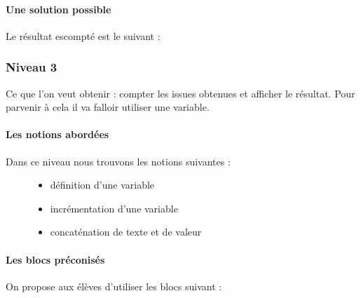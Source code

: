 \documentclass[letterpaper,10pt,french]{sphinxmanual}
\begin{document}
\paragraph{Une solution possible}
\label{\detokenize{decouverte/pileface-bloc2:une-solution-possible}}
Le résultat escompté est le suivant :

\noindent{}


\subsubsection{Niveau 3}
\label{\detokenize{decouverte/pileface-bloc3::doc}}\label{\detokenize{decouverte/pileface-bloc3:niveau-3}}
Ce que l’on veut obtenir : compter les issues obtenues et afficher le résultat.
Pour parvenir à cela il va falloir utiliser une variable.


\paragraph{Les notions abordées}
\label{\detokenize{decouverte/pileface-bloc3:les-notions-abordees}}\begin{description}
\item[{Dans ce niveau nous trouvons les notions suivantes :}] \leavevmode\begin{itemize}
\item {} 
définition d’une variable

\item {} 
incrémentation d’une variable

\item {} 
concaténation de texte et de valeur

\end{itemize}

\end{description}



\paragraph{Les blocs préconisés}
\label{\detokenize{decouverte/pileface-bloc3:les-blocs-preconises}}
On propose aux élèves d’utiliser les blocs suivant :

\end{document}
